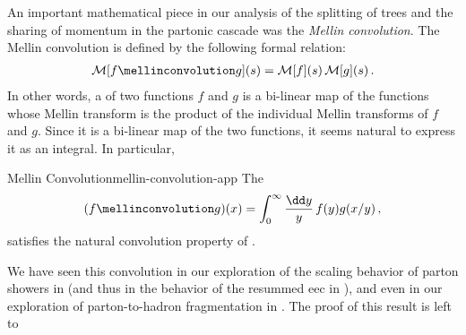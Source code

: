 An important mathematical piece in our analysis of the splitting of trees and the sharing of momentum in the partonic cascade was the \textit{Mellin convolution}.
%
The Mellin convolution is defined by the following formal relation:
\begin{align}
    \label{eq:convolution-property}
    \mathcal{M}[f \mellinconvolution g](s)
    =
    \mathcal{M}[f](s) \, \mathcal{M}[g](s)
    \,.
\end{align}
In other words, a  of two functions \(f\) and \(g\) is a bi-linear map of the functions whose Mellin transform is the product of the individual Mellin transforms of \(f\) and \(g\).
%
Since it is a bi-linear map of the two functions, it seems natural to express it as an integral.
%
In particular,
\begin{proposition}{Mellin Convolution}{mellin-convolution-app}
    The 
    \begin{align}
        (f \mellinconvolution g)(x)
        =
        \int_0^\infty \frac{\dd y}{y}\, f(y) g(x/y)
        \,,
    \end{align}
    satisfies the natural convolution property of .
\end{proposition}
%
We have seen this convolution in our exploration of the scaling behavior of parton showers in  (and thus in the behavior of the resummed \gls{eec} in ), and even in our exploration of parton-to-hadron fragmentation in .
%
The proof of this result is left to 





